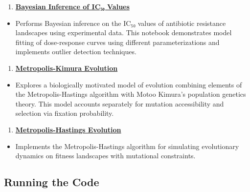 \documentclass[
]{scrartcl}
\providecommand{\tightlist}{%
  \setlength{\itemsep}{0pt}\setlength{\parskip}{0pt}}\usepackage{longtable,booktabs,array}
\begin{document}
\begin{enumerate}
\def\labelenumi{\arabic{enumi}.}
\setcounter{enumi}{2}
\tightlist
\item
  \textbf{\href{code/iwasawa_bayesian_inference.qmd}{Bayesian Inference
  of IC₅₀ Values}}
\end{enumerate}

\begin{itemize}
\tightlist
\item
  Performs Bayesian inference on the IC₅₀ values of antibiotic
  resistance landscapes using experimental data. This notebook
  demonstrates model fitting of dose-response curves using different
  parameterizations and implements outlier detection techniques.
\end{itemize}

\begin{enumerate}
\def\labelenumi{\arabic{enumi}.}
\setcounter{enumi}{3}
\tightlist
\item
  \textbf{\href{code/metropolis_kimura_evolution.qmd}{Metropolis-Kimura
  Evolution}}
\end{enumerate}

\begin{itemize}
\tightlist
\item
  Explores a biologically motivated model of evolution combining
  elements of the Metropolis-Hastings algorithm with Motoo Kimura's
  population genetics theory. This model accounts separately for
  mutation accessibility and selection via fixation probability.
\end{itemize}

\begin{enumerate}
\def\labelenumi{\arabic{enumi}.}
\setcounter{enumi}{4}
\tightlist
\item
  \textbf{\href{code/metropolis_hastings_evolution.qmd}{Metropolis-Hastings
  Evolution}}
\end{enumerate}

\begin{itemize}
\tightlist
\item
  Implements the Metropolis-Hastings algorithm for simulating
  evolutionary dynamics on fitness landscapes with mutational
  constraints.
\end{itemize}

\subsection{Running the Code}\label{running-the-code}
\end{document}
